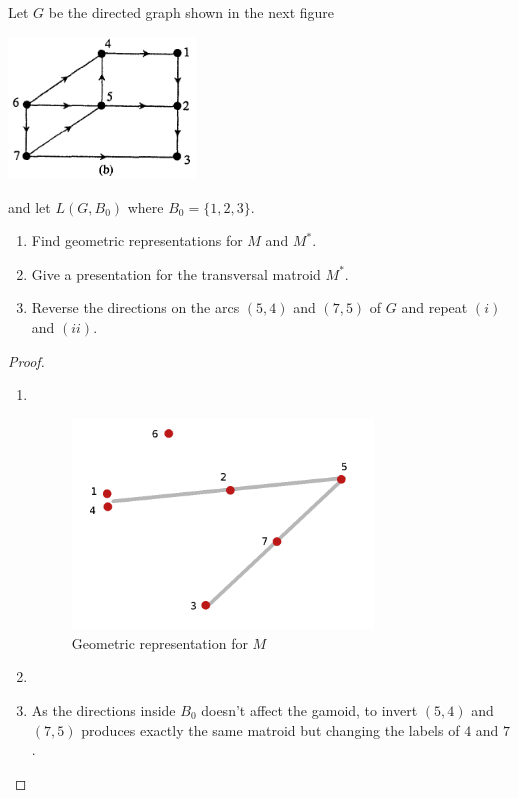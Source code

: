 \prob
{
    Let $G$ be the directed graph shown in the next figure 
		    \begin{center}
                \includegraphics[width=5cm]{Test2/Problem13/Figure2_17.png}
            \end{center}\pn
		and let $L(G, B_0)$ where $B_0 = \{1,2,3\}$. 
    \begin{enumerate}[label=(\roman*)]
        \item   Find geometric representations for $M$ and $M^*$.
        \item   Give a presentation for the transversal matroid $M^*$.
        \item   Reverse the directions on the arcs $(5,4)$ and $(7,5)$ of $G$
                and repeat $(i)$ and $(ii)$.
    \end{enumerate}
}
\begin{proof}
    \begin{enumerate}[label=(\roman*)]
        \item $\,$\pn
             \begin{figure}[H]
                \begin{center}
                    \includegraphics[width=8cm]{Test2/Problem13/GraphicRepresentationM.png}
                \end{center}                            
                \caption{Geometric representation for $M$}
                \label{t2:p13_GraphicRepresentationM.png}                        
            \end{figure}\pn    
        \item
        \item As the directions inside $B_0$ doesn't affect the gamoid, to invert $(5,4)$ and $(7,5)$
                produces exactly the same matroid but changing the labels of $4$ and $7$.\pn
    \end{enumerate}
\end{proof}